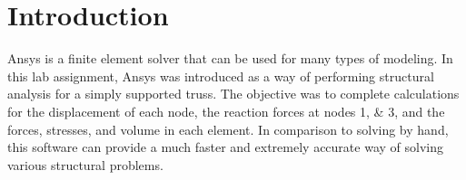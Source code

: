 \chapter{Introduction}\label{cp:introduction}

Ansys is a finite element solver that can be used for many types of modeling. In this lab assignment, Ansys was introduced as a way of performing structural analysis for a simply supported truss. The objective was to complete calculations for the displacement of each node, the reaction forces at nodes \numlist{1;3}, and the forces, stresses, and volume in each element. In comparison to solving by hand, this software can provide a much faster and extremely accurate way of solving various structural problems. 